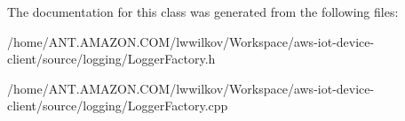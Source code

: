 The documentation for this class was generated from the following files\+:\begin{DoxyCompactItemize}
\item 
/home/\+A\+N\+T.\+A\+M\+A\+Z\+O\+N.\+C\+O\+M/lwwilkov/\+Workspace/aws-\/iot-\/device-\/client/source/logging/Logger\+Factory.\+h\item 
/home/\+A\+N\+T.\+A\+M\+A\+Z\+O\+N.\+C\+O\+M/lwwilkov/\+Workspace/aws-\/iot-\/device-\/client/source/logging/Logger\+Factory.\+cpp\end{DoxyCompactItemize}
